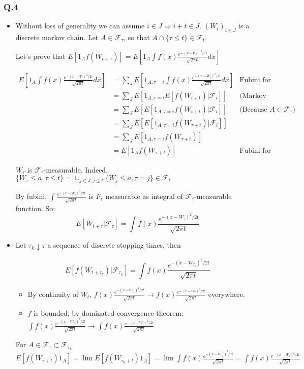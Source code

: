 \documentclass[12pt]{article}
\newcommand{\Q}[1]{\subsubsection*{Q.#1}}
\begin{document}
\Q{4}
\begin{itemize}
\item Without loss of generality we can assume
  $i \in J \Rightarrow i+t \in J$.  $(W_i)_{i \in J}$ is a discrete
  markov chain.  Let $A \in \mathcal F_{\tau}$, so that
  $A \cap \{\tau \le t\} \in \mathcal F_t$.

  Let's prove that  $E[1_A f(W_{t + \tau})] = E[1_A \int f(x)
  \frac{e^{-(x-W_{\tau})^2/2t}}{\sqrt{2\pi t}} dx]$

\begin{align*}
  E[1_A \int f(x) \frac{e^{-(x-W_{\tau})^2/2t}}{\sqrt{2\pi t}} dx]
  &= \sum_J E[1_{A, \tau=i} \int f(x) \frac{e^{-(x-W_i)^2/2t}}{\sqrt{2\pi t}} dx] &\text{Fubini for bounded r.v}
  \\&= \sum_J E[1_{A, \tau=i} E[f(W_{i+t}) | \mathcal F_i]] &\text{(Markov Property)}
  \\&= \sum_J E[ E[ 1_{A, \tau=i}f(W_{i+t}) | \mathcal F_i]]&\text{(Because $A \in \mathcal F_{\tau}$)}
  \\&= \sum_J E[ E[ 1_{A, \tau=i} f(W_{\tau+t}) | \mathcal F_i]]
  \\&= \sum_J E[ 1_{A, \tau=i} f(W_{\tau+t})]
  \\&= E[ 1_A f(W_{\tau+t})] &\text{Fubini for bounded r.v}
\end{align*}

$W_\tau$ is $\mathcal F_\tau$-measurable. Indeed, $\{ W_{\tau} \le a, \tau \le t \} = \cup_{j \in J, j \le t} \{W_j \le a, \tau = j\} \in \mathcal F_t$

By fubini, $\int \frac{e^{-(x-W_{\tau})^2/2t}}{\sqrt{2\pi t}}$  is $F_{\tau}$ measurable as integral of $\mathcal F_{\tau}$-measurable function.
So:
$$E[W_{t+\tau} | \mathcal F_{\tau}] = \int f(x) \frac{e^{-(x-W_{\tau})^2/2t}}{\sqrt{2\pi t}}$$

\item
  Let $\tau_k \downarrow \tau$ a sequence of discrete stopping times, then

  $$E[f(W_{t+\tau_k}) | \mathcal F_{\tau_k}] = \int f(x) \frac{e^{-(x-W_{\tau_k})^2/2t}}{\sqrt{2\pi t}}$$

  \begin{itemize}
  \item By continuity of $W_t$, $f(x) \frac{e^{-(x-W_{\tau_k})^2/2t}}{\sqrt{2\pi t}} \rightarrow f(x) \frac{e^{-(x-W_{\tau})^2/2t}}{\sqrt{2\pi t}}$ everywhere.
  \item $f$ is bounded, by dominated convergence theorem: $\int f(x) \frac{e^{-(x-W_{\tau_k})^2/2t}}{\sqrt{2\pi t}} \rightarrow \int f(x) \frac{e^{-(x-W_{\tau})^2/2t}}{\sqrt{2\pi t}}$
  \end{itemize}
  For $A \in \mathcal F_{\tau} \subset \mathcal F_{\tau_k}$
  $E[f(W_{\tau+t}) 1_A] = \lim E[f(W_{\tau_k + t}) 1_A] = \lim \int f(x) \frac{e^{-(x-W_{\tau_k})^2/2t}}{\sqrt{2\pi t}} = \int f(x) \frac{e^{-(x-W_{\tau})^2/2t}}{\sqrt{2\pi t}}$
\end{itemize}
\end{document}
